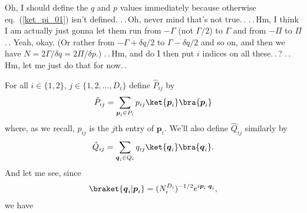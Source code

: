 \documentclass{report}
\begin{document}
Oh, I should define the $q$ and $p$ values immediately because otherwise eq.\ (\ref{ket_pi_01}) isn't defined. .\,.\,Oh, never mind that's not true.\,. .\,.\,Hm, I think I am actually just gonna let them run from $-\Gamma$ (not $\Gamma/2$) to $\Gamma$ and from $-\Pi$ to $\Pi$.\,. Yeah, okay. (Or rather from $-\Gamma + \delta q / 2$ to $\Gamma - \delta q / 2$ and so on, and then we have $N = 2\Gamma/\delta q = 2\Pi / \delta p$.) .\,.\,Hm, and do I then put $i$ indices on all these.\,.\,? .\,.\,Hm, let me just do that for now.\,.

For all $i\in \{1, 2\}$, $j\in\{1, 2, \ldots, D_i\}$ define $\hat P_{ij}$ by
\begin{align}
\begin{aligned}
	\hat P_{ij} = \sum_{\boldsymbol{p}_i \in P_i} p_{ij} \ket{\boldsymbol{p}_i} \bra{\boldsymbol{p}_i} 
\end{aligned}
\end{align} 
where, as we recall, $p_{ij}$ is the $j$th entry of $\boldsymbol{p}_i$. We'll also define $\hat Q_{ij}$ similarly by
\begin{align}
\begin{aligned}
	\hat Q_{ij} = \sum_{\boldsymbol{q}_i \in Q_i} q_{ij} \ket{\boldsymbol{q}_i} \bra{\boldsymbol{q}_i}.
\end{aligned}
\end{align} 
And let me see, since 
\begin{align}
\begin{aligned}
	\braket{\boldsymbol{q}_i| \boldsymbol{p}_i} = 
		(N_i^{D_i})^{-1/2} e^{i \boldsymbol{p}_i \cdot \boldsymbol{q}_i},
\end{aligned}
\end{align} 
we have
\end{document}
